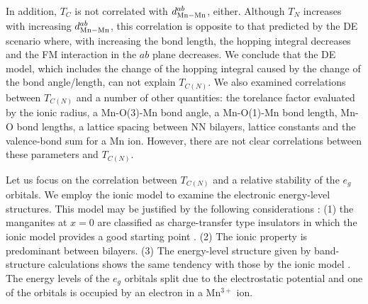 In addition, $T_C$ is not correlated with $d_{\rm Mn-Mn}^{ab}$, either.
Although $T_N$ increases with increasing $d_{\rm Mn-Mn}^{ab}$,
this correlation is opposite to that predicted by the DE scenario where,
with increasing the bond length,
the hopping integral decreases and
the FM interaction in the $ab$ plane decreases.
We conclude that the DE model, which includes the change of the hopping integral
caused by the change of
the bond angle/length, can not explain $T_{C(N)}$.
We also examined correlations between $T_{C(N)}$ and
a number of other quantities:
the torelance factor evaluated by the ionic radius,
a Mn-O(3)-Mn bond angle,
a Mn-O(1)-Mn bond length, Mn-O bond lengths,
a lattice spacing between NN bilayers,
lattice constants and the valence-bond sum for a Mn ion.
However, there are not clear correlations between these parameters
and $T_{C(N)}$.
\par
Let us focus on the correlation between $T_{C(N)}$ and
a relative stability of the $e_g$ orbitals.
We employ the ionic model to examine the electronic energy-level structures.
This model may be justified by
the following considerations \cite{ohta}:
(1) the manganites at $x=0$ are classified as charge-transfer type insulators
in which the ionic model provides a good starting point \cite{arima}.
(2) The ionic property is predominant between bilayers.
(3) The energy-level structure given by band-structure calculations
shows the same tendency with those by the ionic model \cite{dessau,band}.
The energy levels of the $e_g$ orbitals split due to the electrostatic potential
and one of the orbitals is occupied by an electron in a Mn$^{3+}$ ion.

